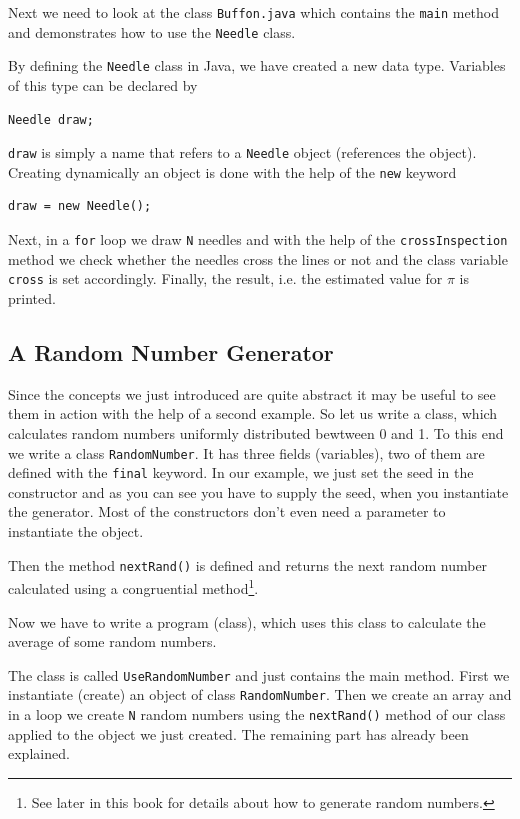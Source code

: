 Next we need to look at the class \verb|Buffon.java| which contains the
\verb|main| method and demonstrates how to use the \verb|Needle| class.

By defining the \verb|Needle| class in Java, we have created a new
data type. Variables of this type can be declared by
\begin{verbatim}
Needle draw;
\end{verbatim}
\verb|draw| is simply a name that refers to a \verb|Needle|
object (references the object). 
Creating dynamically an object
is done with the help of the \verb|new| keyword
\begin{verbatim}
draw = new Needle();
\end{verbatim}
Next, in a \verb|for| loop we draw \verb|N|  needles and with the help
of the \verb|crossInspection| method we check whether the needles
cross the lines or not and the class variable \verb|cross| is set
accordingly. Finally, the result, i.e. the estimated value
for $\pi$ is printed.


\subsection{A Random Number Generator}
Since the concepts we just introduced are quite abstract it may be
useful to see them in action with the help of a second example.
So let us write a class, which calculates random numbers uniformly
distributed bewtween 0 and 1. To this end we write a class
\verb|RandomNumber|. It has three fields (variables), two of them are
defined with the \verb|final| keyword.
In our example, we just set the seed in the constructor and as 
you can see you have to supply the seed, when you instantiate the
generator. Most of the constructors don't even need a parameter to 
instantiate the object. 

Then the method \verb|nextRand()| is defined and returns the next
random number calculated using a congruential method\footnote{See later 
in this book for details about how to generate random numbers.}. 

Now we have to write a program (class), which uses this class to 
calculate the average of some random numbers.

The class is called \verb|UseRandomNumber| and just contains the
main method. First we instantiate (create) an object of class
\verb|RandomNumber|. Then we create an array and in a loop we
create \verb|N| random numbers using the \verb|nextRand()| method
of our class applied to the object we just created. The remaining
part has already been explained.

